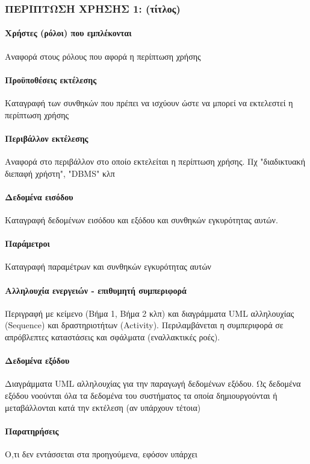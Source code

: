 \subsubsection{ΠΕΡΙΠΤΩΣΗ ΧΡΗΣΗΣ 1: (τίτλος)}
\paragraph{Χρήστες (ρόλοι) που εμπλέκονται}
Αναφορά στους ρόλους που αφορά η περίπτωση χρήσης
\paragraph{Προϋποθέσεις εκτέλεσης}
Καταγραφή των συνθηκών που πρέπει να ισχύουν ώστε να μπορεί να εκτελεστεί η περίπτωση χρήσης
\paragraph{Περιβάλλον εκτέλεσης}
Αναφορά στο περιβάλλον στο οποίο εκτελείται η περίπτωση χρήσης. Πχ "διαδικτυακή διεπαφή χρήστη",
"DBMS" κλπ
\paragraph{Δεδομένα εισόδου}
Καταγραφή δεδομένων εισόδου και εξόδου και συνθηκών εγκυρότητας αυτών.
\paragraph{Παράμετροι}
Καταγραφή παραμέτρων και συνθηκών εγκυρότητας αυτών
\paragraph{Αλληλουχία ενεργειών - επιθυμητή συμπεριφορά}
Περιγραφή με κείμενο (Βήμα 1, Βήμα 2 κλπ) και διαγράμματα UML αλληλουχίας (Sequence) και
δραστηριοτήτων (Activity). Περιλαμβάνεται η συμπεριφορά σε απρόβλεπτες καταστάσεις και σφάλματα
(εναλλακτικές ροές).
\paragraph{Δεδομένα εξόδου}
Διαγράμματα UML αλληλουχίας για την παραγωγή δεδομένων εξόδου. Ως δεδομένα εξόδου νοούνται όλα τα
δεδομένα του συστήματος τα οποία δημιουργούνται ή μεταβάλλονται κατά την εκτέλεση (αν υπάρχουν
τέτοια)
\paragraph{Παρατηρήσεις}
Ο,τι δεν εντάσσεται στα προηγούμενα, εφόσον υπάρχει
